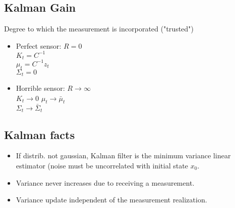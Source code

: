 \subsection*{Kalman Gain}
Degree to which the measurement is incorporated ("trusted")
\begin{itemize}
  \item Perfect sensor: $R = 0$\\
    $K_t = C^{-1}$\\
    $\mu_t = C^{-1} z_t$\\
    $\Sigma_t = 0$
  \item Horrible sensor: $R \to \infty$\\
    $K_t \to 0$
    $\mu_t \to \bar{\mu}_t$\\
    $\Sigma_t \to \bar{\Sigma}_t$
\end{itemize}

\subsection*{Kalman facts}
\begin{itemize}
  \item If distrib. not gaussian, Kalman filter is the minimum variance
    linear estimator (noise must be uncorrelated with initial state
    $x_0$.
  \item \alert{Variance never increases due to receiving a measurement}.
  \item Variance update independent of the measurement realization.
\end{itemize}
